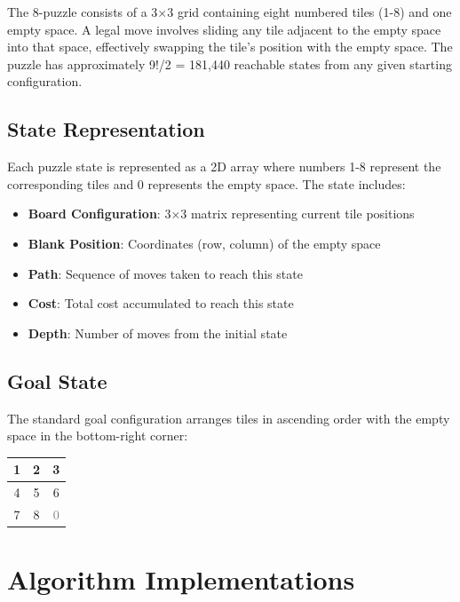 \documentclass[11pt,a4paper]{article}
\begin{document}
The 8-puzzle consists of a 3×3 grid containing eight numbered tiles (1-8) and one empty space. A legal move involves sliding any tile adjacent to the empty space into that space, effectively swapping the tile's position with the empty space. The puzzle has approximately 9!/2 = 181,440 reachable states from any given starting configuration.

\subsection{State Representation}

Each puzzle state is represented as a 2D array where numbers 1-8 represent the corresponding tiles and 0 represents the empty space. The state includes:

\begin{itemize}
\item \textbf{Board Configuration}: 3×3 matrix representing current tile positions
\item \textbf{Blank Position}: Coordinates (row, column) of the empty space
\item \textbf{Path}: Sequence of moves taken to reach this state
\item \textbf{Cost}: Total cost accumulated to reach this state
\item \textbf{Depth}: Number of moves from the initial state
\end{itemize}

\subsection{Goal State}

The standard goal configuration arranges tiles in ascending order with the empty space in the bottom-right corner:

\begin{center}
\begin{tabular}{|c|c|c|}
\hline
1 & 2 & 3 \\
\hline
4 & 5 & 6 \\
\hline
7 & 8 & \textcolor{gray}{0} \\
\hline
\end{tabular}
\end{center}

\section{Algorithm Implementations}
\end{document}
